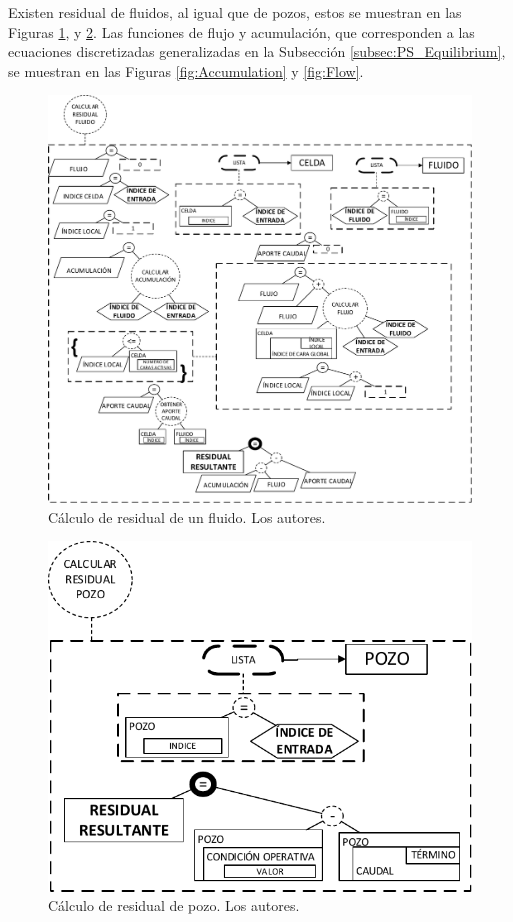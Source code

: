 Existen residual de fluidos, al igual que de pozos, estos se muestran en las Figuras \ref{fig:ResidualFluid}, y \ref{fig:ResidualWell}. Las funciones de flujo y acumulación, que corresponden a las ecuaciones discretizadas generalizadas en la Subsección \ref{subsec:PS_Equilibrium}, se muestran en las Figuras \ref{fig:Accumulation} y \ref{fig:Flow}.
\begin{figure}[h]
	\centering%
	\includegraphics[width=0.9\linewidth]{Fig/CalcularResidualFluido.pdf}%
	\caption[Cálculo de residual de un fluido.]{Cálculo de residual de un fluido. Los autores.} \label{fig:ResidualFluid}
\end{figure}
\begin{figure}[h]
	\centering%
	\includegraphics[width=0.9\linewidth]{Fig/CalcularResidualPozo.pdf}%
	\caption[Cálculo de residual de pozo.]{Cálculo de residual de pozo. Los autores.} \label{fig:ResidualWell}
\end{figure}
